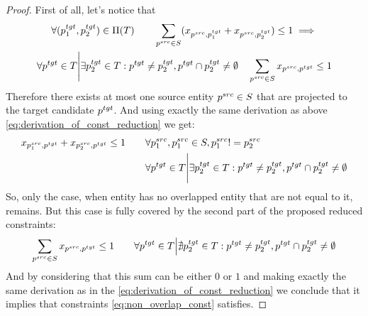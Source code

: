 \begin{proof}
    First of all, let's notice that
    \begin{multline*}
        \forall (p_1^{tgt}, p_2^{tgt}) \in \Pi(T)
        \qquad
        \sum\limits_{p^{src} \in S} (x_{p^{src}, p_1^{tgt}} + x_{p^{src}, p_2^{tgt}}) \leq 1
        \implies                        \\
        \forall p^{tgt} \in T \Bigg| \exists p_2^{tgt} \in T: p^{tgt} \neq p_2^{tgt}, p^{tgt} \cap p_2^{tgt} \neq \emptyset
        \quad
        \sum\limits_{p^{src} \in S} x_{p^{src}, p^{tgt}} \leq 1
    \end{multline*}
    Therefore there exists at most one source entity \( p^{src} \in S \) that are projected
    to the target candidate \( p^{tgt} \).
    And using exactly the same derivation as above \eqref{eq:derivation_of_const_reduction} we get:
    \begin{align*}
        x_{p_1^{src}, p^{tgt}} + x_{p_2^{src}, p^{tgt}} \leq 1 \qquad
         & \forall p_1^{src}, p_1^{src} \in S, p_1^{src} != p_2^{src}                                                          \\
         & \forall p^{tgt} \in T \Bigg| \exists p_2^{tgt} \in T: p^{tgt} \neq p_2^{tgt}, p^{tgt} \cap p_2^{tgt} \neq \emptyset
    \end{align*}
    So, only the case, when entity has no overlapped entity that are
    not equal to it, remains. But this case is fully covered by the second part of the proposed reduced constraints:
    \[
        \sum\limits_{p^{src} \in S} x_{p^{src}, p^{tgt}} \leq 1 \qquad
        \forall p^{tgt} \in T \Big| \nexists p_2^{tgt} \in T: p^{tgt} \neq p_2^{tgt}, p^{tgt} \cap p_2^{tgt} \neq \emptyset
    \]
    And by considering that this sum can be either \( 0 \) or \( 1 \) and making
    exactly the same derivation as in the \eqref{eq:derivation_of_const_reduction} we conclude that it implies that constraints \eqref{eq:non_overlap_const}
    satisfies.
\end{proof}


